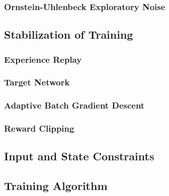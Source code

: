 \subsubsection{Ornstein-Uhlenbeck Exploratory Noise}
\subsection{Stabilization of Training}
\subsubsection{Experience Replay}
\subsubsection{Target Network}
\subsubsection{Adaptive Batch Gradient Descent}
\subsubsection{Reward Clipping}
\subsection{Input and State Constraints}
\subsection{Training Algorithm}

